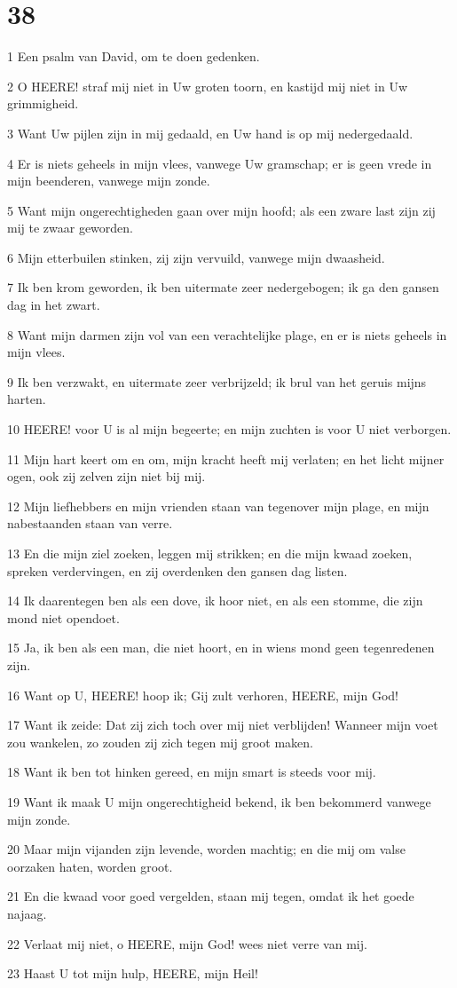 \chapter{38}

\par 1 Een psalm van David, om te doen gedenken.
\par 2 O HEERE! straf mij niet in Uw groten toorn, en kastijd mij niet in Uw grimmigheid.
\par 3 Want Uw pijlen zijn in mij gedaald, en Uw hand is op mij nedergedaald.
\par 4 Er is niets geheels in mijn vlees, vanwege Uw gramschap; er is geen vrede in mijn beenderen, vanwege mijn zonde.
\par 5 Want mijn ongerechtigheden gaan over mijn hoofd; als een zware last zijn zij mij te zwaar geworden.
\par 6 Mijn etterbuilen stinken, zij zijn vervuild, vanwege mijn dwaasheid.
\par 7 Ik ben krom geworden, ik ben uitermate zeer nedergebogen; ik ga den gansen dag in het zwart.
\par 8 Want mijn darmen zijn vol van een verachtelijke plage, en er is niets geheels in mijn vlees.
\par 9 Ik ben verzwakt, en uitermate zeer verbrijzeld; ik brul van het geruis mijns harten.
\par 10 HEERE! voor U is al mijn begeerte; en mijn zuchten is voor U niet verborgen.
\par 11 Mijn hart keert om en om, mijn kracht heeft mij verlaten; en het licht mijner ogen, ook zij zelven zijn niet bij mij.
\par 12 Mijn liefhebbers en mijn vrienden staan van tegenover mijn plage, en mijn nabestaanden staan van verre.
\par 13 En die mijn ziel zoeken, leggen mij strikken; en die mijn kwaad zoeken, spreken verdervingen, en zij overdenken den gansen dag listen.
\par 14 Ik daarentegen ben als een dove, ik hoor niet, en als een stomme, die zijn mond niet opendoet.
\par 15 Ja, ik ben als een man, die niet hoort, en in wiens mond geen tegenredenen zijn.
\par 16 Want op U, HEERE! hoop ik; Gij zult verhoren, HEERE, mijn God!
\par 17 Want ik zeide: Dat zij zich toch over mij niet verblijden! Wanneer mijn voet zou wankelen, zo zouden zij zich tegen mij groot maken.
\par 18 Want ik ben tot hinken gereed, en mijn smart is steeds voor mij.
\par 19 Want ik maak U mijn ongerechtigheid bekend, ik ben bekommerd vanwege mijn zonde.
\par 20 Maar mijn vijanden zijn levende, worden machtig; en die mij om valse oorzaken haten, worden groot.
\par 21 En die kwaad voor goed vergelden, staan mij tegen, omdat ik het goede najaag.
\par 22 Verlaat mij niet, o HEERE, mijn God! wees niet verre van mij.
\par 23 Haast U tot mijn hulp, HEERE, mijn Heil!

